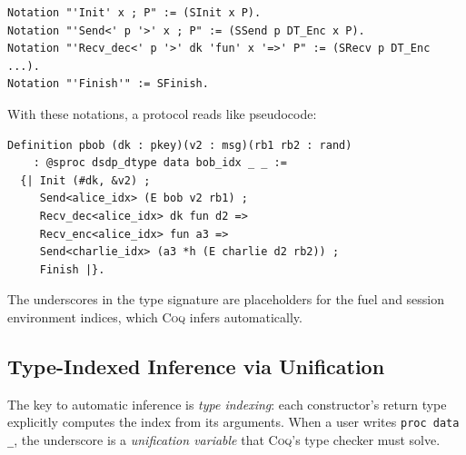 \documentclass[11pt]{article}
\newcommand{\coqin}[1]{\texttt{#1}}
\newcommand{\coq}{\textsc{Coq}}
\begin{document}
\begin{verbatim}
Notation "'Init' x ; P" := (SInit x P).
Notation "'Send<' p '>' x ; P" := (SSend p DT_Enc x P).
Notation "'Recv_dec<' p '>' dk 'fun' x '=>' P" := (SRecv p DT_Enc ...).
Notation "'Finish'" := SFinish.
\end{verbatim}

\noindent
With these notations, a protocol reads like pseudocode:

\begin{verbatim}
Definition pbob (dk : pkey)(v2 : msg)(rb1 rb2 : rand)
    : @sproc dsdp_dtype data bob_idx _ _ :=
  {| Init (#dk, &v2) ;
     Send<alice_idx> (E bob v2 rb1) ;
     Recv_dec<alice_idx> dk fun d2 =>
     Recv_enc<alice_idx> fun a3 =>
     Send<charlie_idx> (a3 *h (E charlie d2 rb2)) ;
     Finish |}.
\end{verbatim}

\noindent
The underscores in the type signature are placeholders for the fuel and
session environment indices, which \coq{} infers automatically.

\subsection{Type-Indexed Inference via Unification}

The key to automatic inference is \emph{type indexing}: each constructor's
return type explicitly computes the index from its arguments. When a user
writes \coqin{proc data \_}, the underscore is a \emph{unification variable}
that \coq{}'s type checker must solve.
\end{document}

